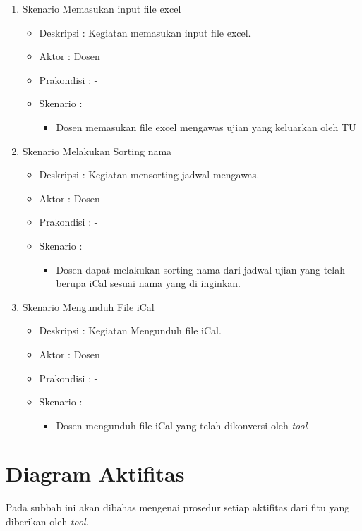 \begin{enumerate}
	\item Skenario Memasukan input file excel \\
	{\renewcommand\labelitemi{}
		\begin{itemize}
			\item Deskripsi		: Kegiatan memasukan input file excel.
			\item Aktor				: Dosen
			\item Prakondisi	: -
			\item Skenario		:
				\begin{itemize}
					\item Dosen memasukan file excel mengawas ujian yang keluarkan oleh TU
				\end{itemize}
		\end{itemize}
		}
		
	\item Skenario Melakukan Sorting nama
	{\renewcommand\labelitemi{}
	\begin{itemize}
			\item Deskripsi		: Kegiatan mensorting jadwal mengawas.
			\item Aktor				: Dosen
			\item Prakondisi	: -
			\item Skenario		:
				\begin{itemize}
					\item Dosen dapat melakukan sorting nama dari jadwal ujian yang telah berupa iCal sesuai nama yang di inginkan. 
				\end{itemize}
		\end{itemize}
		}
		
		\item Skenario Mengunduh File iCal 
		{\renewcommand\labelitemi{}
		\begin{itemize}
			\item Deskripsi		: Kegiatan Mengunduh file iCal.
			\item Aktor				: Dosen 
			\item Prakondisi	: -
			\item Skenario		:
				\begin{itemize}
					\item Dosen mengunduh file iCal yang telah dikonversi oleh \textit{tool}
				\end{itemize}
		\end{itemize}
		}
\end{enumerate}

\section{Diagram Aktifitas}
Pada subbab ini akan dibahas mengenai prosedur setiap aktifitas dari fitu yang diberikan oleh \textit{tool}.

